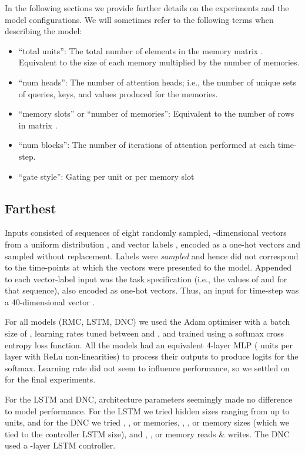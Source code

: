 \documentclass{article}
\begin{document}
In the following sections we provide further details on the experiments and the model configurations. We will sometimes refer to the following terms when describing the model: 
\begin{itemize}
    \item ``total units'': The total number of elements in the memory matrix . Equivalent to the size of each memory multiplied by the number of memories.
    \item ``num heads'': The number of attention heads; i.e., the number of unique sets of queries, keys, and values produced for the memories. 
    \item ``memory slots'' or ``number of memories'': Equivalent to the number of rows in matrix .
    \item ``num blocks'': The number of iterations of attention performed at each time-step.
    \item ``gate style'': Gating per unit or per memory slot
\end{itemize}


\subsection{ Farthest}
Inputs consisted of sequences of eight randomly sampled, -dimensional vectors from a uniform distribution , and vector labels , encoded as a one-hot vectors and sampled without replacement. Labels were \textit{sampled} and hence did not correspond to the time-points at which the vectors were presented to the model. Appended to each vector-label input was the task specification (i.e., the values of  and  for that sequence), also encoded as one-hot vectors. Thus, an input for time-step  was a 40-dimensional vector .

For all models (RMC, LSTM, DNC) we used the Adam optimiser \cite{kingma2014adam} with a batch size of , learning rates tuned between  and , and trained using a softmax cross entropy loss function. All the models had an equivalent 4-layer MLP ( units per layer with ReLu non-linearities) to process their outputs to produce logits for the softmax. Learning rate did not seem to influence performance, so we settled on  for the final experiments.

For the LSTM and DNC, architecture parameters seemingly made no difference to model performance. For the LSTM we tried hidden sizes ranging from  up to  units, and for the DNC we tried , , or  memories, , , or  memory sizes (which we tied to the controller LSTM size), and , , or  memory reads \& writes. The DNC used a -layer LSTM controller. 
\end{document}
